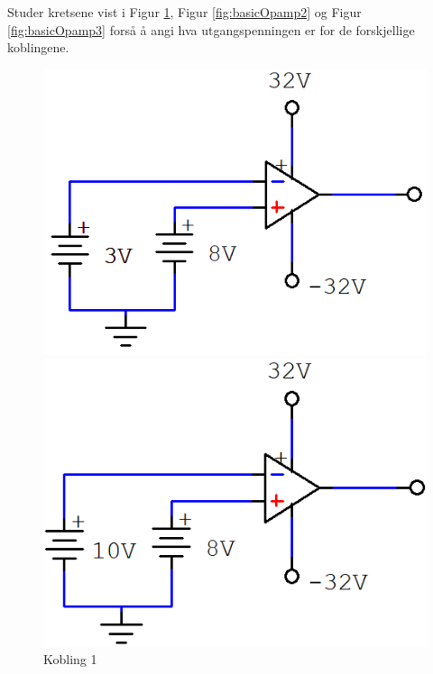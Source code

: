 \begin{question}[name=Oppgave, topic=operasjonsforsterker]
Studer kretsene vist i Figur \ref{fig:basicOpamp1}, Figur \ref{fig:basicOpamp2} og Figur \ref{fig:basicOpamp3} forså å angi hva utgangspenningen er for de forskjellige koblingene.

	\begin{figure}[H]
		\centering
		\begin{minipage}{0.45\textwidth}
			\includegraphics[width=\textwidth]{operasjonsforsterker/figurer/basic1.png}
			\caption{Kobling 1}
			\label{fig:basicOpamp1}
		\end{minipage}\hfill
		\begin{minipage}{0.45\textwidth}
			\includegraphics[width=\textwidth]{operasjonsforsterker/figurer/basic2.png}

\end{minipage}
\end{figure}
\end{question}
